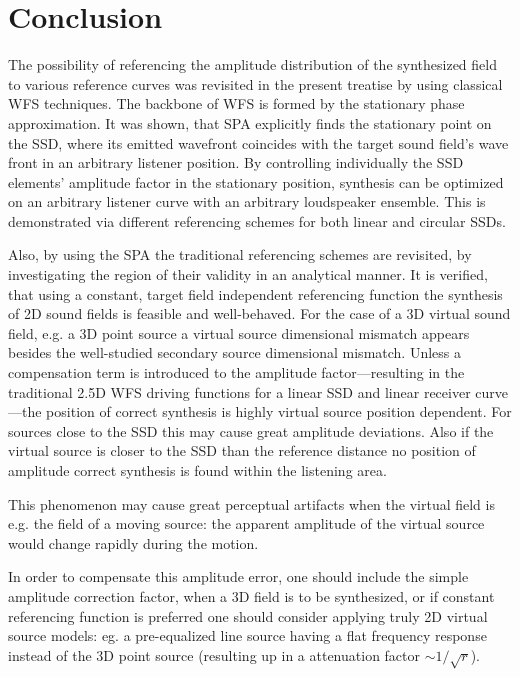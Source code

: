 \documentclass[12pt,a4paper]{article}
\begin{document}
\section{Conclusion}

The possibility of referencing the amplitude distribution of the synthesized field to various reference curves was revisited in the present treatise by using classical WFS techniques. The backbone of WFS is formed by the stationary phase approximation. It was shown, that SPA explicitly finds the stationary point on the SSD, where its emitted wavefront coincides with the target sound field's wave front in an arbitrary listener position. By controlling individually the  SSD elements' amplitude factor in the stationary position, synthesis can be optimized on an arbitrary listener curve with an arbitrary loudspeaker ensemble. This is demonstrated via different referencing schemes for both linear and circular SSDs.

Also, by using the SPA the traditional referencing schemes are revisited, by investigating the region of their validity in an analytical manner. It is verified, that using a constant, target field independent referencing function the synthesis of 2D sound fields is feasible and well-behaved. For the case of a 3D virtual sound field, e.g. a 3D point source a virtual source dimensional mismatch appears besides the well-studied secondary source dimensional mismatch. Unless a compensation term is introduced to the amplitude factor---resulting in the traditional 2.5D WFS driving functions for a linear SSD and linear receiver curve---the position of correct synthesis is highly virtual source position dependent. For sources close to the SSD this may cause great amplitude deviations. Also if the virtual source is closer to the SSD than the reference distance no position of amplitude correct synthesis is found within the listening area. 

This phenomenon may cause great perceptual artifacts when the virtual field is e.g. the field of a moving source: the apparent amplitude of the virtual source would change rapidly during the motion.

In order to compensate this amplitude error, one should include the simple amplitude correction factor, when a 3D field is to be synthesized, or if constant referencing function is preferred one should consider applying truly 2D virtual source models: eg. a pre-equalized line source having a flat frequency response instead of the 3D point source (resulting up in a attenuation factor $\sim 1/\sqrt{r}$).
\end{document}
